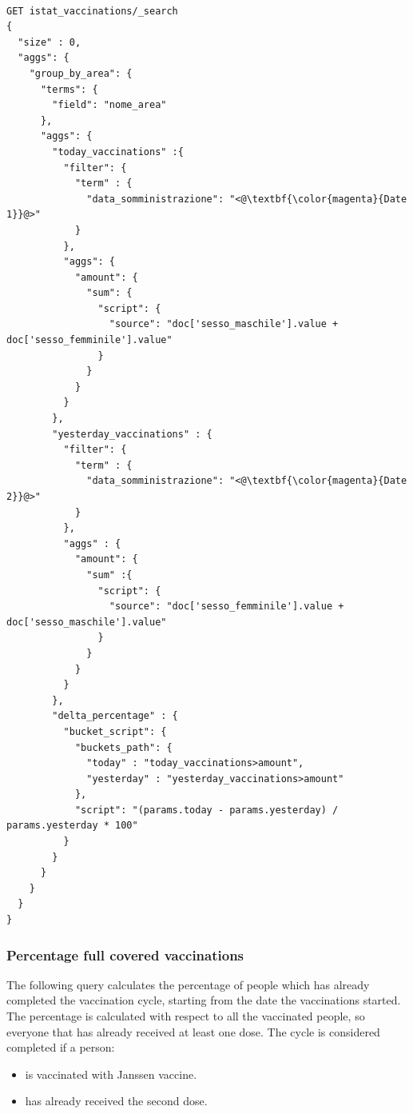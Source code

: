 \documentclass{article}
\begin{document}
\begin{lstlisting}[language=cypher, label=lst:cypher-example]

GET istat_vaccinations/_search
{
  "size" : 0,
  "aggs": {
    "group_by_area": {
      "terms": {
        "field": "nome_area"
      },
      "aggs": {
        "today_vaccinations" :{
          "filter": {
            "term" : {
              "data_somministrazione": "<@\textbf{\color{magenta}{Date 1}}@>"
            }
          },
          "aggs": {
            "amount": {
              "sum": {
                "script": {
                  "source": "doc['sesso_maschile'].value + doc['sesso_femminile'].value"
                }
              }
            }
          }
        },
        "yesterday_vaccinations" : {
          "filter": {
            "term" : {
              "data_somministrazione": "<@\textbf{\color{magenta}{Date 2}}@>"
            }
          },
          "aggs" : {
            "amount": {
              "sum" :{
                "script": {
                  "source": "doc['sesso_femminile'].value + doc['sesso_maschile'].value"
                }
              }
            }
          }
        },
        "delta_percentage" : {
          "bucket_script": {
            "buckets_path": {
              "today" : "today_vaccinations>amount",
              "yesterday" : "yesterday_vaccinations>amount"
            },
            "script": "(params.today - params.yesterday) / params.yesterday * 100"
          }
        }
      }
    }
  }
}

\end{lstlisting}
\newpage
\subsubsection{Percentage full covered vaccinations}
The following query calculates the percentage of people which has already completed the vaccination cycle, starting from the date the vaccinations started. The percentage is calculated with respect to all the vaccinated people, so everyone that has already received at least one dose.
The cycle is considered completed if a person:
\begin{itemize}
\item is vaccinated with Janssen vaccine.
\item has already received the second dose.
\end{itemize}
\end{document}
